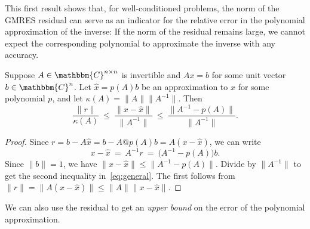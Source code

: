 \documentclass{siamart}
\def\C{\mathbbm{C}}
\def\Cn{\C^n}
\def\Cnn{\C^{n\times n}}
\def\wh#1{\widehat{#1}}
\begin{document}
This first result shows that, for well-conditioned problems, the norm of the GMRES residual can serve as an indicator for the relative error in the polynomial approximation of the inverse:  If the norm of the residual remains large, we cannot expect the corresponding polynomial to approximate the inverse with any accuracy.  

\begin{theorem} \label{thm:general}
Suppose $A\in\Cnn$ is invertible and $Ax=b$ for some unit vector $b\in\Cn$.
Let $\wh{x} = p(A) b$ be an approximation to $x$ for some polynomial $p$, and let $\kappa(A) = \|A\| \|A^{-1}\|$.
Then 
\begin{equation} \label{eq:general}
\frac{\|r\|}{\kappa(A)} 
   \ \le\ \frac{\|x-\wh{x}\|}{\|A^{-1}\|} 
   \ \le\ \frac{\|A^{-1} - p(A)\|}{ \|A^{-1}\|}.
\end{equation}
\end{theorem}
\begin{proof}
Since $r= b - A \wh{x} = b - A@ p(A) b = A(x-\wh{x})$, we can write
\[ x - \wh{x} \ =\ A^{-1}r\ =\ \big(A^{-1} - p(A)\big)b.\]
Since $\|b\|=1$, we have $\|x-\wh{x}\| \le \|A^{-1}-p(A)\|$.
Divide by $\|A^{-1}\|$ to get the second inequality in~\eqref{eq:general}.  The first follows from 
$\|r\| = \|A(x-\wh{x})\| \le \|A\| \|x-\wh{x}\|$.
\end{proof}

We can also use the residual to get an \emph{upper bound} on the error of the polynomial approximation.  
\end{document}
